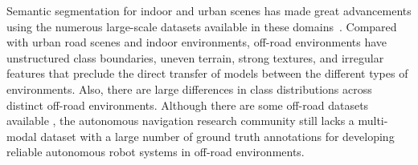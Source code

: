\documentclass[letterpaper, 10 pt, conference]{ieeeconf}
\begin{document}
Semantic segmentation for indoor and urban scenes has made great advancements using the numerous large-scale datasets available in these domains~\cite{Maturana2018, Feng2020,Brostow2009, Cordts2016, Caesar2019,Silberman2012, Zhou2017}. 
Compared with urban road scenes and indoor environments, off-road environments have unstructured class boundaries, uneven terrain, strong textures, and irregular features that preclude the direct transfer of models between the different types of environments. Also, there are large differences in class distributions across distinct off-road environments. Although there are some off-road datasets available \cite{Maturana2018, RUGD2019IROS, valada16iser}, the autonomous navigation research community still lacks a multi-modal dataset with a large number of ground truth annotations for developing reliable autonomous robot systems in off-road environments.
\end{document}
